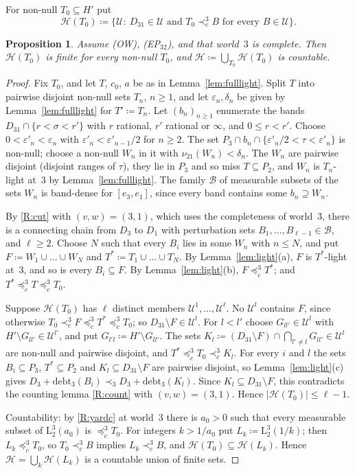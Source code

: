 \documentclass[11pt]{article}
\newtheorem{proposition}[theorem]{Proposition}
\theoremstyle{definition}\newtheorem{definition}[theorem]{Definition}
\theoremstyle{remark}\newtheorem{remark}[theorem]{Remark}
\newcommand{\debt}{\mathrm{debt}}
\newcommand{\Uf}{\mathcal U}
\newcommand{\Bfam}{\mathcal B}
\newcommand{\Hset}{\mathcal H}
\newcommand{\Lo}[3]{\mathrm L^{#1}_{#2}(#3)}
\begin{document}
For non-null $T_0\subseteq H'$ put
\[
 \Hset(T_0)\coloneqq\{\Uf:\ D_{31}\in\Uf\text{ and }T_0\prec^3_cB\text{ for
 every }B\in\Uf\}.
\]

\begin{proposition}\label{prop:count3}
Assume (OW), (EP$_{32}$), and that world~$3$ is complete. Then
$\Hset(T_0)$ is finite for every non-null $T_0$, and
$\Hset\coloneqq\bigcup_{T_0}\Hset(T_0)$ is countable.
\end{proposition}
\begin{proof}
Fix $T_0$, and let $T$, $c_0$, $a$ be as in Lemma~\ref{lem:fulllight}.
Split $T$ into pairwise disjoint non-null sets $T_n$, $n\ge1$, and let
$\varepsilon_n,\delta_n$ be given by Lemma~\ref{lem:fulllight} for $T'\coloneqq T_n$.
Let $(b_n)_{n\ge1}$ enumerate the bands $D_{31}\cap\{r<\sigma<r'\}$ with $r$
rational, $r'$ rational or $\infty$, and $0\le r<r'$. Choose $0<\varepsilon'_n<\varepsilon_n$
with $\varepsilon'_n<\varepsilon'_{n-1}/2$ for $n\ge2$. The set $P_3\cap
b_n\cap\{\varepsilon'_n/2<\tau<\varepsilon'_n\}$ is non-null; choose a non-null $W_n$ in it with
$\nu_{21}(W_n)<\delta_n$. The $W_n$ are pairwise disjoint (disjoint ranges
of $\tau$), they lie in $P_3$ and so miss $T\subseteq P_2$, and $W_n$ is
$T_n$-light at~$3$ by Lemma~\ref{lem:fulllight}. The family $\Bfam$ of
measurable subsets of the sets $W_n$ is band-dense for $[e_3,e_1]$, since
every band contains some $b_n\supseteq W_n$.

By \ref{R:cut} with $(v,w)=(3,1)$, which uses the completeness of
world~$3$, there is a connecting chain from $D_3$ to $D_1$ with perturbation
sets $B_1,\dots,B_{\ell-1}\in\Bfam$, and $\ell\ge2$. Choose $N$ such that
every $B_i$ lies in some $W_n$ with $n\le N$, and put $F\coloneqq
W_1\cup\dots\cup W_N$ and $T^*\coloneqq T_1\cup\dots\cup T_N$. By
Lemma~\ref{lem:light}(a), $F$ is $T^*$-light at~$3$, and so is every
$B_i\subseteq F$. By Lemma~\ref{lem:light}(b), $F\preceq^3_cT^*$; and
$T^*\preceq^3_cT\preceq^3_cT_0$.

Suppose $\Hset(T_0)$ has $\ell$ distinct members $\Uf^1,\dots,\Uf^\ell$. No
$\Uf^l$ contains $F$, since otherwise
$T_0\prec^3_cF\preceq^3_cT^*\preceq^3_cT_0$; so $D_{31}\setminus F\in\Uf^l$.
For $l<l'$ choose $G_{ll'}\in\Uf^l$ with $H'\setminus G_{ll'}\in\Uf^{l'}$,
and put $G_{l'l}\coloneqq H'\setminus G_{ll'}$. The sets
$K_l\coloneqq(D_{31}\setminus F)\cap\bigcap_{l'\ne l}G_{ll'}\in\Uf^l$ are
non-null and pairwise disjoint, and $T^*\preceq^3_cT_0\prec^3_cK_l$. For
every $i$ and $l$ the sets $B_i\subseteq P_3$, $T^*\subseteq P_2$ and
$K_l\subseteq D_{31}\setminus F$ are pairwise disjoint, so
Lemma~\ref{lem:light}(c) gives
$D_3+\debt_3(B_i)\prec_3D_3+\debt_3(K_l)$. Since $K_l\subseteq
D_{31}\setminus F$, this contradicts the counting lemma \ref{R:count} with
$(v,w)=(3,1)$. Hence $|\Hset(T_0)|\le\ell-1$.

Countability: by \ref{R:yardc} at world~$3$ there is $a_0>0$ such that every
measurable subset of $\Lo32{a_0}$ is $\preceq^3_cT_0$. For integers
$k>1/a_0$ put $L_k\coloneqq\Lo32{1/k}$; then $L_k\preceq^3_cT_0$, so
$T_0\prec^3_cB$ implies $L_k\prec^3_cB$, and
$\Hset(T_0)\subseteq\Hset(L_k)$. Hence $\Hset=\bigcup_k\Hset(L_k)$ is a
countable union of finite sets.
\end{proof}
\end{document}
